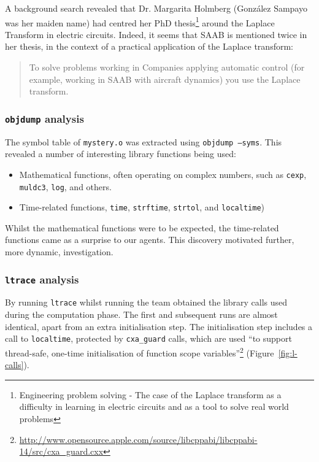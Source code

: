 A background search revealed that Dr. Margarita Holmberg (Gonz\'{a}lez Sampayo was her maiden name) had centred her PhD thesis\footnote{Engineering problem solving
- The case of the Laplace transform as a difficulty in learning in electric circuits and as a tool to solve real world problems} around the Laplace Transform in electric circuits. Indeed, it seems that SAAB is mentioned twice in her thesis, in the context of a practical application of the Laplace transform:

\begin{quote}
To solve problems working in Companies applying automatic control (for example, working in SAAB with aircraft dynamics) you use the Laplace transform.
\end{quote}




\subsubsection{\texttt{objdump} analysis}
The symbol table of \texttt{mystery.o} was extracted using \texttt{objdump --syms}. This revealed a number of interesting library functions being used:
\begin{itemize}
\item Mathematical functions, often operating on complex numbers, such as \texttt{cexp}, \texttt{muldc3}, \texttt{log}, and others.
\item Time-related functions, \texttt{time}, \texttt{strftime}, \texttt{strtol}, and \texttt{localtime})
\end{itemize}

Whilst the mathematical functions were to be expected, the time-related functions came as a surprise to our agents. This discovery motivated further, more dynamic, investigation.


\subsubsection{\texttt{ltrace} analysis}
By running \texttt{ltrace} whilst running the team obtained the library calls used during the computation phase. The first and subsequent runs are almost identical, apart from an extra initialisation step. The initialisation step includes a call to \texttt{localtime}, protected by \texttt{cxa\_guard} calls, which are used ``to support thread-safe, one-time initialisation of function scope variables''\footnote{\url{http://www.opensource.apple.com/source/libcppabi/libcppabi-14/src/cxa_guard.cxx}} (Figure~\ref{fig:l-calls}).


